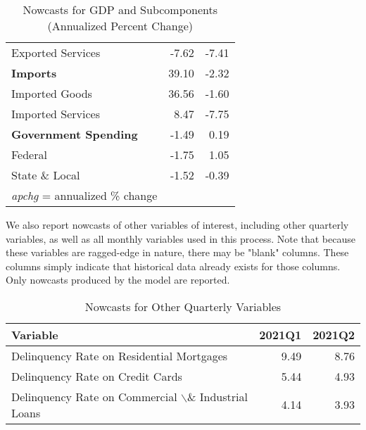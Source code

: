 \documentclass[11pt, letterpaper]{article}\usepackage[]{graphicx}\usepackage[]{color}
\begin{document}
\begin{table}[H]
\begin{tabular}{lrr}
  \hspace{8mm}  Exported Services & -7.62 & -7.41 \\ 
  \hspace{0mm} \textbf{Imports} & 39.10 & -2.32 \\ 
  \hspace{8mm}  Imported Goods & 36.56 & -1.60 \\ 
  \hspace{8mm}  Imported Services & 8.47 & -7.75 \\ 
  \hspace{0mm} \textbf{Government Spending} & -1.49 & 0.19 \\ 
  \hspace{8mm}  Federal & -1.75 & 1.05 \\ 
  \hspace{8mm}  State \& Local & -1.52 & -0.39 \\ 
   \hline 
 \textit{apchg} = annualized \% change 
\end{tabular}
\endgroup
\caption{Nowcasts for GDP and Subcomponents (Annualized Percent Change)} 
\end{table}


We also report nowcasts of other variables of interest, including other quarterly variables, as well as all monthly variables used in this process. Note that because these variables are ragged-edge in nature, there may be "blank" columns. These columns simply indicate that historical data already exists for those columns. Only nowcasts produced by the model are reported.
\begin{table}[H]
\centering
\begingroup\fontsize{11pt}{13pt}\selectfont
\begin{tabular}{lrr}
  \hline
Variable & 2021Q1 & 2021Q2 \\ 
  \hline
Delinquency Rate on Residential Mortgages & 9.49 & 8.76 \\ 
  Delinquency Rate on Credit Cards & 5.44 & 4.93 \\ 
  Delinquency Rate on Commercial $\backslash$\& Industrial Loans & 4.14 & 3.93 \\ 
   \hline
\end{tabular}
\endgroup
\caption{Nowcasts for Other Quarterly Variables} 
\end{table}
\end{document}
